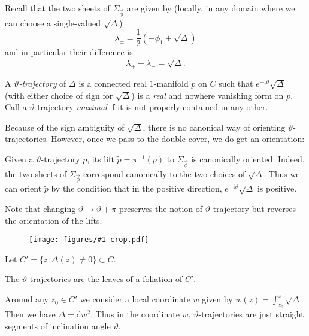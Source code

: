 \documentclass[12pt,letterpaper,reqno]{article}
\numberwithin{equation}{section}
\newcommand{\half}{\ensuremath{\frac{1}{2}}}
\newcommand{\I}{{\mathrm i}}
\newcommand{\de}{\mathrm{d}}
\newcommand{\ti}[1]{\textit{#1}}
\newcommand{\insfig}[2]{\begin{figure}[htbp] \centering \texttt{[image: figures/\#1-crop.pdf]} \label{fig:#1} \end{figure}}
\begin{document}
Recall that the two sheets of $\Sigma_{\vec\phi}$ are given by
(locally, in any domain where we can choose a single-valued $\sqrt{\Delta}$)
\begin{equation}
	\lambda_{\pm} = \half (-\phi_1 \pm \sqrt{\Delta})
\end{equation}
and in particular their difference is
\begin{equation}
	\lambda_+ - \lambda_- = \sqrt{\Delta}.
\end{equation}

\begin{defn}
A \ti{$\vartheta$-trajectory} of $\Delta$ is a connected 
real $1$-manifold $p$ on $C$
such that $e^{- \I \vartheta} \sqrt \Delta$ (with either choice of sign
for $\sqrt{\Delta}$) is a
\ti{real} and nowhere vanishing form on $p$. 
Call a $\vartheta$-trajectory \ti{maximal} if
it is not properly contained in any other.
\end{defn}

Because of the sign ambiguity of $\sqrt{\Delta}$, there is no canonical
way of orienting $\vartheta$-trajectories. However, once we pass to the 
double cover, we do get an orientation:

\begin{defn}
Given a $\vartheta$-trajectory $p$, its lift $\tilde{p} = \pi^{-1}(p)$
to $\Sigma_{\vec\phi}$ is canonically oriented. Indeed, 
the two sheets of $\Sigma_{\vec\phi}$
correspond canonically to the two choices of $\sqrt{\Delta}$.
Thus we can orient $\tilde{p}$ by the condition that
in the positive direction, $e^{-\I \vartheta} \sqrt{\Delta}$
is positive.
\end{defn}

Note that changing $\vartheta \to \vartheta+\pi$ preserves
the notion of $\vartheta$-trajectory but reverses the
orientation of the lifts.

\insfig{higgs-bundles-17}{0.8}


Let $C' = \{z: \Delta(z) \neq 0\} \subset C$.

\begin{prop} The 
$\vartheta$-trajectories are the leaves of a foliation of $C'$.
\end{prop}
\begin{pf} Around any $z_0 \in C'$ we consider a local coordinate
$w$ given by $w(z) = \int^z_{z_0} \sqrt{\Delta}$. Then
we have $\Delta = \de w^2$. Thus in the coordinate $w$, 
$\vartheta$-trajectories are just straight segments 
of inclination angle $\vartheta$.
\end{pf}
\end{document}
